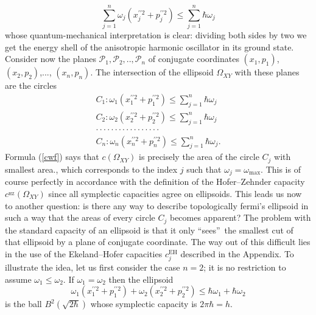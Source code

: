 \documentclass[11pt]{article}%
\begin{document}
\begin{equation}
\sum_{j=1}^{n}\omega_{j}(x_{j}^{\prime\prime2}+p_{j}^{\prime\prime2})\leq
\sum_{j=1}^{n}\hbar\omega_{j} \label{omf1}%
\end{equation}
whose quantum-mechanical interpretation is clear: dividing both sides by two
we get the energy shell of the anisotropic harmonic oscillator in its ground
state. Consider now the planes $\mathcal{P}_{1},\mathcal{P}_{2},..,\mathcal{P}%
_{n}$ of conjugate coordinates $(x_{1},p_{1})$, $(x_{2},p_{2})$,...,
$(x_{n},p_{n})$. The intersection of the ellipsoid $\Omega_{XY}$ with these
planes are the circles
\begin{gather*}
C_{1}:\omega_{1}(x_{1}^{\prime\prime2}+p_{1}^{\prime\prime2})\leq\sum
_{j=1}^{n}\hbar\omega_{j}\\
C_{2}:\omega_{2}(x_{2}^{\prime\prime2}+p_{2}^{\prime\prime2})\leq\sum
_{j=1}^{n}\hbar\omega_{j}\\
\cdot\cdot\cdot\cdot\cdot\cdot\cdot\cdot\cdot\cdot\cdot\cdot\cdot\cdot
\cdot\cdot\cdot\\
C_{n}:\omega_{n}(x_{n}^{\prime\prime2}+p_{n}^{\prime\prime2})\leq\sum
_{j=1}^{n}\hbar\omega_{j}.
\end{gather*}
Formula (\ref{cwf}) says that $c(\Omega_{XY})$ is precisely the area of the
circle $C_{j}$ with smallest area., which corresponds to the index $j$ such
that $\omega_{j}=\omega_{\max}$. This is of course perfectly in accordance
with the definition of the Hofer--Zehnder capacity $c^{_{\mathrm{HZ}}}%
(\Omega_{XY})$ since all symplectic capacities agree on ellipsoids. This leads
us now to another question: is there any way to describe topologically fermi's
ellipsoid in such a way that the areas of every circle $C_{j}$ becomes
apparent? The problem with the standard capacity of an ellipsoid is that it
only \textquotedblleft sees\textquotedblright\ the smallest cut of that
ellipsoid by a plane of conjugate coordinate. The way out of this difficult
lies in the use of the Ekeland--Hofer capacities $c_{j}^{\mathrm{EH}}$
described in the Appendix. To illustrate the idea, let us first consider the
case $n=2$; it is no restriction to assume $\omega_{1}\leq\omega_{2}$. If
$\omega_{1}=\omega_{2}$ then the ellipsoid%
\begin{equation}
\omega_{1}(x_{1}^{\prime\prime2}+p_{1}^{\prime\prime2})+\omega_{2}%
(x_{2}^{\prime\prime2}+p_{2}^{\prime\prime2})\leq\hbar\omega_{1}+\hbar
\omega_{2} \label{omf2}%
\end{equation}
is the ball $B^{2}(\sqrt{2\hbar})$ whose symplectic capacity is $2\pi\hbar=h$.
\end{document}
